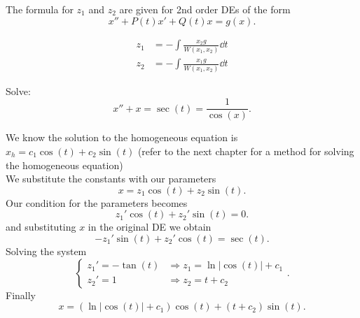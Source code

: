The formula for $z_1$ and $z_2$ are given for 2nd order DEs of the form
\[
	x''+P(t)x'+Q(t)x=g(x)
	.\]

\begin{align*}
	z_1 & =-\int\frac{x_2g}{W(x_1,x_2)}\dd{t} \\
	z_2 & =-\int\frac{x_1g}{W(x_1,x_2)}\dd{t}
\end{align*}

\begin{example}
	Solve:
	\[
		x''+x=\sec(t)=\frac{1}{\cos(x)}
		.\]

	We know the solution to the homogeneous equation is $x_h = c_1\cos(t)+c_2\sin(t)$ (refer to the next chapter for a method for solving the homogeneous equation)\\
	We substitute the constants with our parameters
	\[
		x = z_1\cos(t) + z_2\sin(t)
		.\]
	Our condition for the parameters becomes
	\[
		z_1'\cos(t) + z_2'\sin(t)=0
		.\]
	and substituting $x$ in the original DE we obtain
	\[
		-z_1'\sin(t)+z_2'\cos(t) = \sec(t)
		.\]
	Solving the system
	\[
		\begin{cases}
			z_1' = -\tan(t) & \Rightarrow z_1 = \ln{|\cos(t)|} + c_1 \\
			z_2' = 1        & \Rightarrow z_2=t+c_2
		\end{cases}
		.\]
	Finally
	\[
		x = (\ln{|\cos(t)|}+c_1)\cos(t) + (t+c_2)\sin(t)
		.\]
\end{example}
